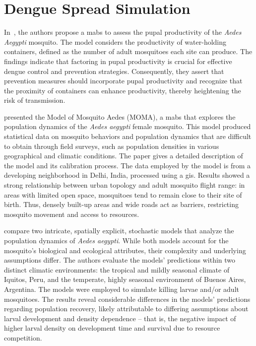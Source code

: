 \section{Dengue Spread Simulation}\label{sec:dengue-spread-simulation}

In~\cite{Borges2015}, the authors propose a \gls{mabs} to assess the pupal
productivity of the \textit{Aedes Aegypti} mosquito. The model considers the
productivity of water-holding containers, defined as the number of adult
mosquitoes each site can produce. The findings indicate that factoring in pupal
productivity is crucial for effective dengue control and prevention strategies.
Consequently, they assert that prevention measures should incorporate pupal
productivity and recognize that the proximity of containers can enhance
productivity, thereby heightening the risk of transmission.

\cite{maneerat:2016} presented the Model of Mosquito Aedes (MOMA), a \gls{mabs}
that explores the population dynamics of the \textit{Aedes aegypti} female
mosquito. This model produced statistical data on mosquito behaviors and
population dynamics that are difficult to obtain through field surveys, such as
population densities in various geographical and climatic conditions. The paper
gives a detailed description of the model and its calibration process. The data
employed by the model is from a developing neighborhood in Delhi, India,
processed using a \gls{gis}. Results showed a strong relationship between urban
topology and adult mosquito flight range: in areas with limited open space,
mosquitoes tend to remain close to their site of birth. Thus, densely built-up
areas and wide roads act as barriers, restricting mosquito movement and access
to resources.

\cite{Legros2016} compare two intricate, spatially explicit, stochastic models
that analyze the population dynamics of \textit{Aedes aegypti}. While both
models account for the mosquito's biological and ecological attributes, their
complexity and underlying assumptions differ. The authors evaluate the models’
predictions within two distinct climatic environments: the tropical and mildly
seasonal climate of Iquitos, Peru, and the temperate, highly seasonal
environment of Buenos Aires, Argentina. The models were employed to simulate
killing larvae and/or adult mosquitoes. The results reveal considerable
differences in the models' predictions regarding population recovery, likely
attributable to differing assumptions about larval development and density
dependence -- that is, the negative impact of higher larval density on
development time and survival due to resource competition.

